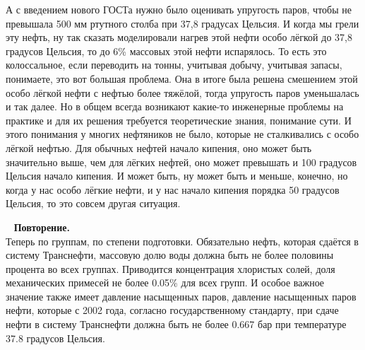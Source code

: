 \documentclass[main.tex]{subfiles}
\begin{document}
А с введением нового ГОСТа нужно было оценивать упругость паров, чтобы не превышала 500 мм ртутного столба при 37,8 градусах Цельсия.
И когда мы грели эту нефть, ну так сказать моделировали нагрев этой нефти особо лёгкой до 37,8 градусов Цельсия, то до 6\% массовых этой нефти испарялось.
То есть это колоссальное, если переводить на тонны, учитывая добычу, учитывая запасы, понимаете, это вот большая проблема.
Она в итоге была решена смешением этой особо лёгкой нефти с нефтью более тяжёлой, тогда упругость паров уменьшалась и так далее.
Но в общем всегда возникают какие-то инженерные проблемы на практике и для их решения требуется теоретические знания, понимание сути.
И этого понимания у многих нефтяников не было, которые не сталкивались с особо лёгкой нефтью.
Для обычных нефтей начало кипения, оно может быть значительно выше, чем для лёгких нефтей, оно может превышать и 100 градусов Цельсия начало кипения.
И может быть, ну может быть и меньше, конечно, но когда у нас особо лёгкие нефти, и у нас начало кипения порядка 50 градусов Цельсия, то это совсем другая ситуация.

\ \newline
\textbf{Повторение.}\\
Теперь по группам, по степени подготовки.
Обязательно нефть, которая сдаётся в систему Транснефти, массовую долю воды должна быть не более половины процента во всех группах.
Приводится концентрация хлористых солей, доля механических примесей не более 0.05\% для всех групп.
И особое важное значение также имеет давление насыщенных паров, давление насыщенных паров нефти, которые с 2002 года, согласно государственному стандарту, при сдаче нефти в систему Транснефти должна быть не более 0.667 бар при температуре 37.8 градусов Цельсия.
\end{document}
